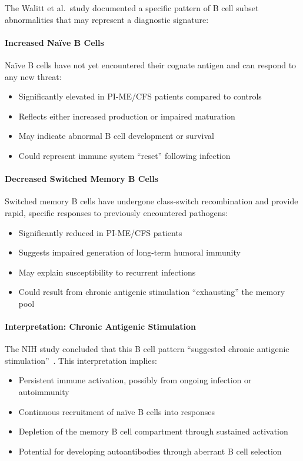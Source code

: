 The Walitt et al.\ study documented a specific pattern of B cell subset abnormalities that may represent a diagnostic signature:

\paragraph{Increased Naïve B Cells}
Naïve B cells have not yet encountered their cognate antigen and can respond to any new threat:
\begin{itemize}
    \item Significantly elevated in PI-ME/CFS patients compared to controls
    \item Reflects either increased production or impaired maturation
    \item May indicate abnormal B cell development or survival
    \item Could represent immune system ``reset'' following infection
\end{itemize}

\paragraph{Decreased Switched Memory B Cells}
Switched memory B cells have undergone class-switch recombination and provide rapid, specific responses to previously encountered pathogens:
\begin{itemize}
    \item Significantly reduced in PI-ME/CFS patients
    \item Suggests impaired generation of long-term humoral immunity
    \item May explain susceptibility to recurrent infections
    \item Could result from chronic antigenic stimulation ``exhausting'' the memory pool
\end{itemize}

\paragraph{Interpretation: Chronic Antigenic Stimulation}
The NIH study concluded that this B cell pattern ``suggested chronic antigenic stimulation''~\cite{walitt2024deep}. This interpretation implies:
\begin{itemize}
    \item Persistent immune activation, possibly from ongoing infection or autoimmunity
    \item Continuous recruitment of naïve B cells into responses
    \item Depletion of the memory B cell compartment through sustained activation
    \item Potential for developing autoantibodies through aberrant B cell selection
\end{itemize}

